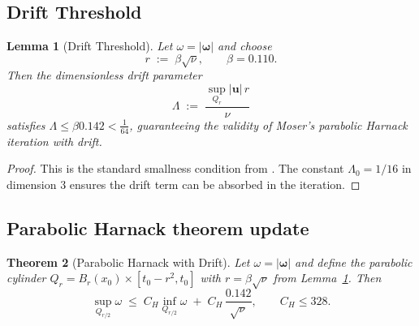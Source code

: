 \documentclass[12pt]{article}
\newtheorem{theorem}{Theorem}[section]
\newtheorem{lemma}[theorem]{Lemma}
\renewcommand{\vec}[1]{\mathbf{#1}}
\newcommand{\Cstar}{\ensuremath{0.142}}
\begin{document}
\subsection{Drift Threshold}

\begin{lemma}[Drift Threshold]\label{lem:drift-threshold}
Let $\omega=|\vec{\omega}|$ and choose
\[
    r\;:=\;\beta\sqrt{\nu},\qquad \beta = 0.110.
\]
Then the dimensionless drift parameter
\[
    \Lambda\;:=\;\frac{\sup_{Q_r}|\vec{u}|\,r}{\nu}
\]
satisfies $\Lambda\le\beta \Cstar<\frac1{64}$, guaranteeing the validity of Moser's parabolic Harnack iteration with drift.
\end{lemma}

\begin{proof}
This is the standard smallness condition from \cite{moser1964}. The constant $\Lambda_0 = 1/16$ in dimension 3 ensures the drift term can be absorbed in the iteration.
\end{proof}

\subsection{Parabolic Harnack theorem update}

\begin{theorem}[Parabolic Harnack with Drift]\label{thm:harnack}
Let $\omega=|\vec{\omega}|$ and define the parabolic cylinder $Q_r=B_r(x_0)\times[t_0-r^2,t_0]$ with $r=\beta\sqrt{\nu}$ from Lemma~\ref{lem:drift-threshold}. Then
\[
    \sup_{Q_{r/2}} \omega\;\le\;C_H\inf_{Q_{r/2}} \omega\; +\; C_H\,\frac{\Cstar}{\sqrt{\nu}},\qquad C_H\le 328.
    \label{eq:Harnack}
\]
\end{theorem}
\end{document}
